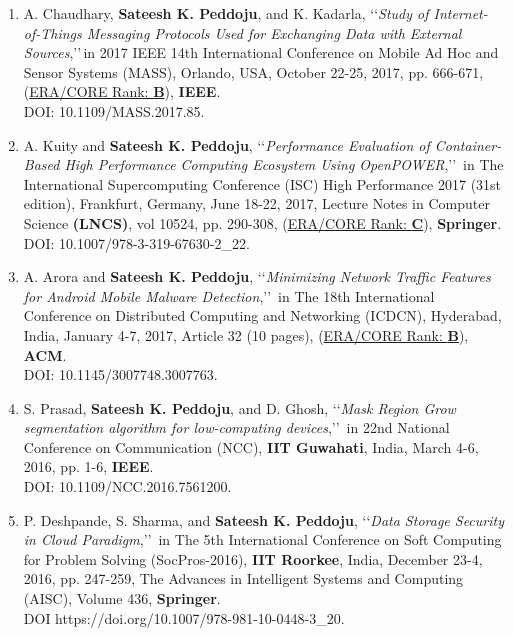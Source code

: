\begin{enumerate}
		\item
	A. Chaudhary, \textbf{Sateesh K. Peddoju}, and K. Kadarla, \lq\lq \textit{Study of Internet-of-Things Messaging Protocols Used for Exchanging Data with External Sources},\rq\rq\,in 2017 IEEE 14th International Conference on Mobile Ad Hoc and Sensor Systems (MASS), Orlando, USA, October 22-25, 2017, pp. 666-671, (\underline{ERA/CORE Rank: \textbf{B}}), \textbf{IEEE}. \\DOI: 10.1109/MASS.2017.85.
	
	\item
	A. Kuity and \textbf{Sateesh K. Peddoju}, \lq\lq \textit{Performance Evaluation of Container-Based High Performance Computing Ecosystem Using OpenPOWER},\rq\rq\, in The International Supercomputing Conference (ISC) High Performance 2017 (31st edition), Frankfurt, Germany, June 18-22, 2017, Lecture Notes in Computer Science \textbf{(LNCS)}, vol 10524, pp. 290-308,  (\underline{ERA/CORE Rank: \textbf{C}}), \textbf{Springer}. \\DOI: 10.1007/978-3-319-67630-2\_22.
	
	\item
	A. Arora and \textbf{Sateesh K. Peddoju}, \lq\lq \textit{Minimizing Network Traffic Features for Android Mobile Malware Detection},\rq\rq\, in The 18th International Conference on Distributed Computing and Networking (ICDCN), Hyderabad, India, January 4-7, 2017, Article 32 (10 pages), (\underline{ERA/CORE Rank: \textbf{B}}), \textbf{ACM}.  \\DOI: 10.1145/3007748.3007763.
	
	\item
	S. Prasad, \textbf{Sateesh K. Peddoju}, and D. Ghosh, \lq\lq \textit{Mask Region Grow segmentation algorithm for low-computing devices},\rq\rq\, in 22nd National Conference on Communication (NCC), \textbf{IIT Guwahati}, India, March 4-6, 2016, pp. 1-6, \textbf{IEEE}. \\DOI: 10.1109/NCC.2016.7561200.
	
	\item
	P. Deshpande, S. Sharma, and \textbf{Sateesh K. Peddoju}, \lq\lq \textit{Data Storage Security in Cloud Paradigm},\rq\rq\, in The 5th International Conference on Soft Computing for Problem Solving (SocPros-2016), \textbf{IIT Roorkee}, India, December 23-4, 2016, pp. 247-259, The Advances in Intelligent Systems and Computing (AISC), Volume 436,  \textbf{Springer}. \\DOI
https://doi.org/10.1007/978-981-10-0448-3\_20.
	

\end{enumerate}
